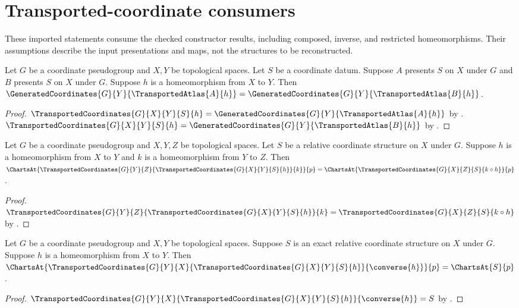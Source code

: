 \section{Transported-coordinate consumers}



These imported statements consume the checked constructor results, including
composed, inverse, and restricted homeomorphisms. Their assumptions describe
the input presentations and maps, not the structures to be reconstructed.

\begin{theorem}\label{transported_presentations_consumer}
    Let $G$ be a coordinate pseudogroup and $X,Y$ be topological spaces.
    Let $S$ be a coordinate datum.
    Suppose $A$ presents $S$ on $X$ under $G$ and $B$ presents $S$ on $X$ under $G$.
    Suppose $h$ is a homeomorphism from $X$ to $Y$.
    Then $\GeneratedCoordinates{G}{Y}{\TransportedAtlas{A}{h}}
        =\GeneratedCoordinates{G}{Y}{\TransportedAtlas{B}{h}}$.
\end{theorem}
\begin{proof}
    $\TransportedCoordinates{G}{X}{Y}{S}{h}=\GeneratedCoordinates{G}{Y}{\TransportedAtlas{A}{h}}$ by
        .
    $\TransportedCoordinates{G}{X}{Y}{S}{h}=\GeneratedCoordinates{G}{Y}{\TransportedAtlas{B}{h}}$ by
        .
\end{proof}

\begin{theorem}\label{transported_charts_composition_consumer}
    Let $G$ be a coordinate pseudogroup and $X,Y,Z$ be topological spaces.
    Let $S$ be a relative coordinate structure on $X$ under $G$.
    Suppose $h$ is a homeomorphism from $X$ to $Y$ and $k$ is a homeomorphism from $Y$ to $Z$.
    Then $\ChartsAt{\TransportedCoordinates{G}{Y}{Z}{\TransportedCoordinates{G}{X}{Y}{S}{h}}{k}}{p}
        =\ChartsAt{\TransportedCoordinates{G}{X}{Z}{S}{k\circ h}}{p}$.
\end{theorem}
\begin{proof}
    $\TransportedCoordinates{G}{Y}{Z}{\TransportedCoordinates{G}{X}{Y}{S}{h}}{k}
        =\TransportedCoordinates{G}{X}{Z}{S}{k\circ h}$ by .
\end{proof}

\begin{theorem}\label{transported_charts_roundtrip_consumer}
    Let $G$ be a coordinate pseudogroup and $X,Y$ be topological spaces.
    Suppose $S$ is an exact relative coordinate structure on $X$ under $G$.
    Suppose $h$ is a homeomorphism from $X$ to $Y$.
    Then $\ChartsAt{\TransportedCoordinates{G}{Y}{X}{\TransportedCoordinates{G}{X}{Y}{S}{h}}{\converse{h}}}{p}
        =\ChartsAt{S}{p}$.
\end{theorem}
\begin{proof}
    $\TransportedCoordinates{G}{Y}{X}{\TransportedCoordinates{G}{X}{Y}{S}{h}}{\converse{h}}=S$ by
        .
\end{proof}

